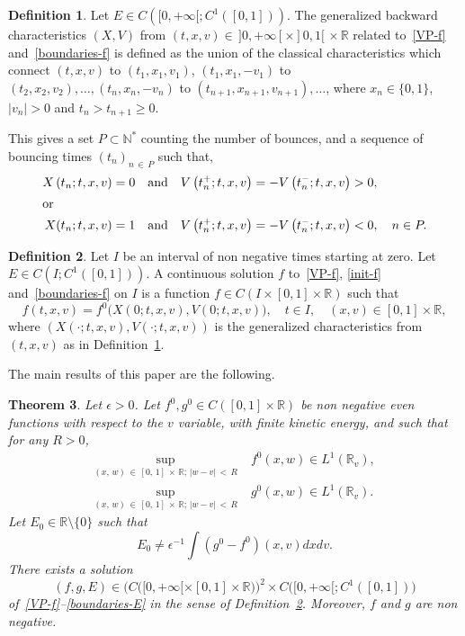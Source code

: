 \documentclass[10pt]{amsart}
\newtheorem{theo}{Theorem}[section]
\theoremstyle{definition}\newtheorem{defi}[theo]{Definition}\newtheorem{rema}[theo]{Remark}\newtheorem{exam}[theo]{Example}\newtheorem{exem}[theo]{Example}\newtheorem{nota}[theo]{Notation}
\newcommand{\R}{\mathbb{R}}
\newcommand{\N}{\mathbb{N}}
\begin{document}
\begin{defi}\label{generalized_characteristics}
Let $E\in C([0,+\infty [; C^1([0,1]))$. The generalized backward characteristics $(X,V)$ from $(t,x,v) \in\, ]0,+\infty [
\times]0,1[\,\times \R$ related to~\eqref{VP-f} and~\eqref{boundaries-f} is defined as the union of the classical characteristics which connect $(t,x,v)$ to $(t_1,x_1,v_1)$, $(t_1,x_1,-v_1)$ to $(t_2,x_2,v_2), \ldots, (t_n,x_n,-v_n)$ to $(t_{n+1},x_{n+1},v_{n+1}), \ldots$, where $x_n \in
\{0,1\}$, $|v_n|>0$ and $t_n>t_{n+1} \geq 0$.
\end{defi}

This gives a set $P \subset \N ^*$ counting the number of bounces, and a sequence of bouncing times $(t_n)_{n\,\in\,P}$ such that,
\begin{align*}
X\left(t_n;t,x,v\right) = 0 \quad &\text{and}\quad V\left(t_n^+;t,x,v\right) = - V\left(t_n^-;t,x,v\right)> 0,
\\
\intertext{or}
X(t_n;t,x,v) = 1\quad &\text{and}\quad V\left(t_n^+;t,x,v\right) = - V\left(t_n^-;t,x,v\right) < 0,\quad n\in P.
\end{align*}

\begin{defi}\label{df-f}
Let $I$ be an interval of non negative times starting at zero. Let $E\in C(I; C^1([0,1]))$. A continuous solution $f$ to~\eqref{VP-f}, \eqref{init-f} and~\eqref{boundaries-f} on $I$ is a function $f\in C(I\times [0,1] \times \R)$ such that
\begin{equation}\label{continuite-f}
f(t,x,v)= f^0\big(X(0; t,x,v),V(0; t,x,v)\big),\quad t\in I,\quad (x,v)\in [0,1]\times \R,
\end{equation}
where $(X(\cdot ; t,x,v),V(\cdot ; t,x,v))$ is the generalized characteristics from $(t,x,v)$ as in Definition~\ref{generalized_characteristics}.
\end{defi}


The main results of this paper are the following.


\begin{theo}\label{main-result-existence}
Let $\epsilon >0$. Let $f^0, g^0 \in C([0,1] \times \R)$ be non negative even functions with respect to the $v$ variable, with finite kinetic energy, and such that for any $R>0$,
\begin{equation}\label{hyp1-f0}
\begin{split}
\sup_{(x,\,w)\,\in\,[0,\,1]\,\times\,\R ;\,|w-v|\,<\,R}\; &f^0(x,w) \in L^1\left(\R_v\right), \\\sup_{(x,\,w)\,\in\,[0,\,1]\,\times\,\R ; \,|w-v|\,<\,R}\; &g^0(x,w) \in L^1\left(\R_v\right).
\end{split}
\end{equation}
Let $E_0\in \R \setminus \{ 0\} $ such that
\begin{equation}\label{hyp-E0-E1different-de-zero}
E_0 \neq \epsilon ^{-1} \int \left(g^0-f^0\right)(x,v)dxdv.
\end{equation}
There exists a solution
\[
(f,g,E) \in \big(C\big([0,+\infty [\times [0,1] \times \R\big)\big)^2 \times C\big([0,+\infty [; C^1([0,1])\big)
\]
of~\eqref{VP-f}--\eqref{boundaries-E} in the sense of Definition~\ref{df-f}. Moreover, $f$ and $g$ are non negative.
\end{theo}
\end{document}
